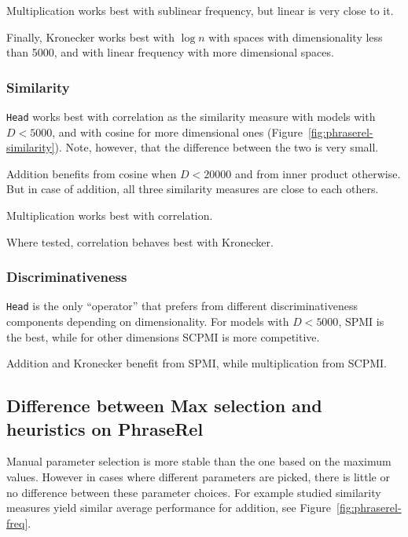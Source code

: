 Multiplication works best with sublinear frequency, but linear is very close to it.

Finally, Kronecker works best with $\log n$ with spaces with dimensionality less than 5000, and with linear frequency with more dimensional spaces.

\subsubsection{Similarity}
\label{sec:similarity-phraserel}

\texttt{Head} works best with correlation as the similarity measure with models with $D < 5000$, and with cosine for more dimensional ones (Figure~\ref{fig:phraserel-similarity}). Note, however, that the difference between the two is very small.

Addition benefits from cosine when $D < 20000$ and from inner product otherwise. But in case of addition, all three similarity measures are close to each others.

Multiplication works best with correlation.

Where tested, correlation behaves best with Kronecker.

\subsubsection{Discriminativeness}
\label{sec:discriminativeness-phraserel}



\texttt{Head} is the only ``operator'' that prefers from different discriminativeness components depending on dimensionality. For models with $D < 5000$, SPMI is the best, while for other dimensions SCPMI is more competitive.

Addition and Kronecker benefit from SPMI, while multiplication from SCPMI.

\subsection{Difference between Max selection and heuristics on PhraseRel}
\label{sec:diff-phraserel}

Manual parameter selection is more stable than the one based on the maximum values. However in cases where different parameters are picked, there is little or no difference between these parameter choices. For example studied similarity measures yield similar average performance for addition, see Figure~\ref{fig:phraserel-freq}.

